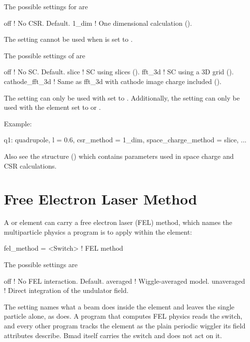 The possible settings for  are
\begin{example}
  off             ! No CSR. Default.
  1_dim           ! One dimensional calculation ().
\end{example}
The  setting cannot be used when  is set to  .

The possible settings of  are
\begin{example}
  off             ! No SC. Default.
  slice           ! SC using slices ().
  fft_3d          ! SC using a 3D grid ().
  cathode_fft_3d  ! Same as fft_3d with cathode image charge included ().
\end{example}
The  setting can only be used with  set to . Additionally,
the  setting can only be used with the element  set to
 or .

Example:
\begin{example}
  q1: quadrupole, l = 0.6, csr_method = 1_dim, space_charge_method = slice, ...
\end{example}

Also see the  structure () which contains parameters used in
space charge and CSR calculations.

\section{Free Electron Laser Method}
\label{s:fel.meth}

A  or  element can carry a free electron laser (FEL) method, which
names the multiparticle physics a program is to apply within the element:
\begin{example}
  fel_method          = <Switch>   ! FEL method
\end{example}

The possible settings are
\begin{example}
  off             ! No FEL interaction. Default.
  averaged        ! Wiggle-averaged model.
  unaveraged      ! Direct integration of the undulator field.
\end{example}

The setting names what a beam does inside the element and leaves the single particle
 alone, as  does. A program that computes FEL
physics reads the switch, and every other program tracks the element as the plain periodic
wiggler its field attributes describe. Bmad itself carries the switch and does not act on it.

